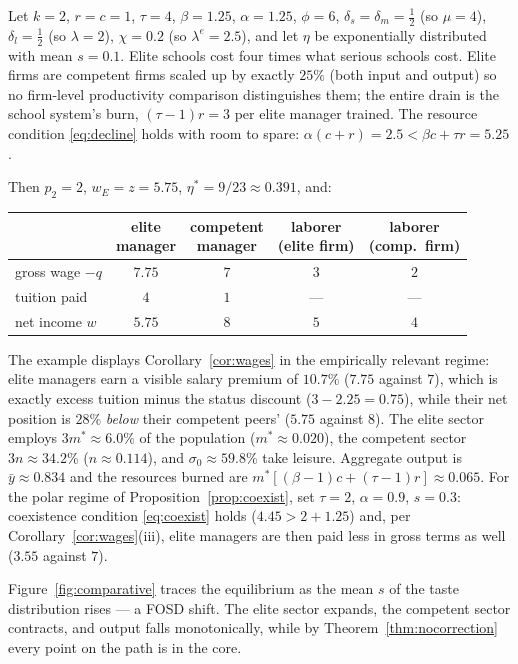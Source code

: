 \documentclass[12pt,letterpaper]{article}
\theoremstyle{definition}
\begin{document}
Let $k=2$, $r=c=1$, $\tau=4$, $\beta=1.25$, $\alpha=1.25$, $\phi=6$, $\delta_s=\delta_m=\tfrac12$ (so $\mu=4$), $\delta_l=\tfrac12$ (so $\lambda=2$), $\chi=0.2$ (so $\lambda^{e}=2.5$), and let $\eta$ be exponentially distributed with mean $s=0.1$.
Elite schools cost four times what serious schools cost.
Elite firms are competent firms scaled up by exactly $25\%$ (both input and output) so no firm-level productivity comparison distinguishes them; the entire drain is the school system's burn, $(\tau-1)r=3$ per elite manager trained.
The resource condition \eqref{eq:decline} holds with room to spare: $\alpha(c+r)=2.5 < \beta c+\tau r = 5.25$.

Then $p_2=2$, $w_E=z=5.75$, $\eta^\ast=9/23\approx 0.391$, and:
\begin{center}
{\small
\begin{tabular}{lcccc}
\toprule
 & \shortstack{elite\\manager}
 & \shortstack{competent\\manager}
 & \shortstack{laborer\\(elite firm)}
 & \shortstack{laborer\\(comp.\ firm)}\\
\midrule
gross wage $-q$ & $7.75$ & $7$ & $3$ & $2$\\
tuition paid & $4$ & $1$ & --- & ---\\
net income $w$ & $5.75$ & $8$ & $5$ & $4$\\
\bottomrule
\end{tabular}
}
\end{center}
The example displays Corollary~\ref{cor:wages} in the empirically relevant regime: elite managers earn a visible salary premium of $10.7\%$ ($7.75$ against $7$), which is exactly excess tuition minus the status discount ($3 - 2.25 = 0.75$), while their net position is $28\%$ \emph{below} their competent peers' ($5.75$ against $8$).
The elite sector employs $3m^\ast\approx 6.0\%$ of the population ($m^\ast\approx 0.020$), the competent sector $3n\approx 34.2\%$ ($n\approx 0.114$), and $\sigma_0\approx 59.8\%$ take leisure.
Aggregate output is $\bar{y}\approx 0.834$ and the resources burned are $m^\ast[(\beta-1)c+(\tau-1)r]\approx 0.065$.
For the polar regime of Proposition~\ref{prop:coexist}, set $\tau=2$, $\alpha=0.9$, $s=0.3$: coexistence condition \eqref{eq:coexist} holds ($4.45 > 2 + 1.25$) and, per Corollary~\ref{cor:wages}(iii), elite managers are then paid less in gross terms as well ($3.55$ against $7$).

Figure~\ref{fig:comparative} traces the equilibrium as the mean $s$ of the taste distribution rises --- a FOSD shift.
The elite sector expands, the competent sector contracts, and output falls monotonically, while by Theorem~\ref{thm:nocorrection} every point on the path is in the core.
\end{document}
